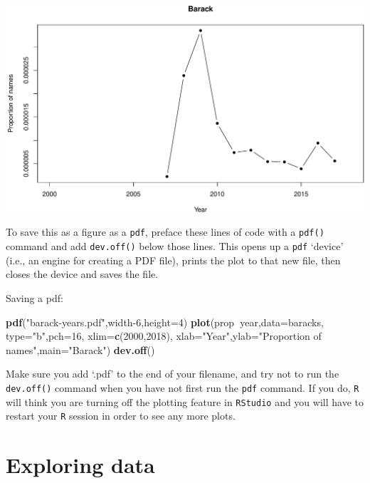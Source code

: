 \documentclass[
]{book}
\newenvironment{Shaded}{\begin{snugshade}}{\end{snugshade}}
\newcommand{\DataTypeTok}[1]{\textcolor[rgb]{0.13,0.29,0.53}{#1}}
\newcommand{\DecValTok}[1]{\textcolor[rgb]{0.00,0.00,0.81}{#1}}
\newcommand{\KeywordTok}[1]{\textcolor[rgb]{0.13,0.29,0.53}{\textbf{#1}}}
\newcommand{\NormalTok}[1]{#1}
\newcommand{\OperatorTok}[1]{\textcolor[rgb]{0.81,0.36,0.00}{\textbf{#1}}}
\newcommand{\StringTok}[1]{\textcolor[rgb]{0.31,0.60,0.02}{#1}}
\begin{document}
\includegraphics{figures/unnamed-chunk-172-1.pdf}

To save this as a figure as a \texttt{pdf}, preface these lines of code with a \texttt{pdf()} command and add \texttt{dev.off()} below those lines. This opens up a \texttt{pdf} `device' (i.e., an engine for creating a PDF file), prints the plot to that new file, then closes the device and saves the file.

Saving a pdf:

\begin{Shaded}
\begin{Highlighting}[]
\KeywordTok{pdf}\NormalTok{(}\StringTok{"barack-years.pdf"}\NormalTok{,width}\DecValTok{-6}\NormalTok{,}\DataTypeTok{height=}\DecValTok{4}\NormalTok{)}
\KeywordTok{plot}\NormalTok{(prop}\OperatorTok{~}\NormalTok{year,}\DataTypeTok{data=}\NormalTok{baracks,}
     \DataTypeTok{type=}\StringTok{"b"}\NormalTok{,}\DataTypeTok{pch=}\DecValTok{16}\NormalTok{,}
     \DataTypeTok{xlim=}\KeywordTok{c}\NormalTok{(}\DecValTok{2000}\NormalTok{,}\DecValTok{2018}\NormalTok{),}
     \DataTypeTok{xlab=}\StringTok{"Year"}\NormalTok{,}\DataTypeTok{ylab=}\StringTok{"Proportion of names"}\NormalTok{,}\DataTypeTok{main=}\StringTok{"Barack"}\NormalTok{)}
\KeywordTok{dev.off}\NormalTok{()}
\end{Highlighting}
\end{Shaded}

Make sure you add `.pdf' to the end of your filename, and try not to run the \texttt{dev.off()} command when you have not first run the \texttt{pdf} command. If you do, \texttt{R} will think you are turning off the plotting feature in \texttt{RStudio} and you will have to restart your \texttt{R} session in order to see any more plots.

\hypertarget{exploring-data}{%
\chapter{Exploring data}\label{exploring-data}}
\end{document}
